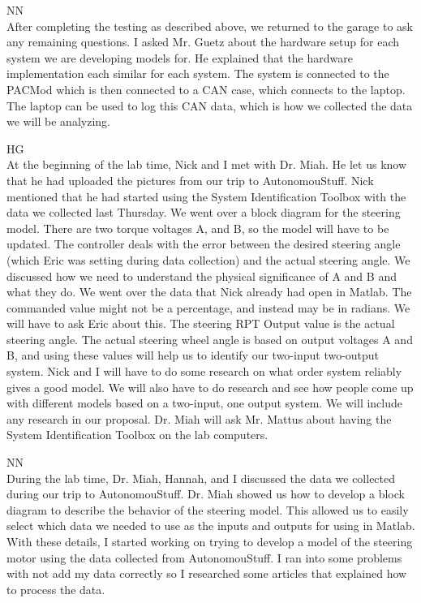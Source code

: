 \documentclass[fontsize=11pt, %
                             paper=letter, %
                             openany, %
                             captions=tableheading,
                             index=totoc,
                             hyperref]{labbook}
\def\currentYear{2021}
\begin{document}
\begin{addmargin}[0cm]{0cm}
NN\\
After completing the testing as described above, we returned to the garage to ask any remaining questions. I asked Mr. Guetz about the hardware setup for each system we are developing models for. He explained that the hardware implementation each similar for each system. The system is connected to the PACMod which is then connected to a CAN case, which connects to the laptop. The laptop can be used to log this CAN data, which is how we collected the data we will be analyzing. 

\labday{Thursday, October 14, \currentYear}
HG\\
At the beginning of the lab time, Nick and I met with Dr. Miah. He let us know that he had uploaded the pictures from our trip to AutonomouStuff. Nick mentioned that he had started using the System Identification Toolbox with the data we collected last Thursday. We went over a block diagram for the steering model. There are two torque voltages A, and B, so the model will have to be updated. The controller deals with the error between the desired steering angle (which Eric was setting during data collection) and the actual steering angle. We discussed how we need to understand the physical significance of A and B and what they do. We went over the data that Nick already had open in Matlab. The commanded value might not be a percentage, and instead may be in radians. We will have to ask Eric about this. The steering RPT Output value is the actual steering angle. The actual steering wheel angle is based on output voltages A and B, and using these values will help us to identify our two-input two-output system. Nick and I will have to do some research on what order system reliably gives a good model. We will also have to do research and see how people come up with different models based on a two-input, one output system. We will include any research in our proposal. Dr. Miah will ask Mr. Mattus about having the System Identification Toolbox on the lab computers. 

NN\\
During the lab time, Dr. Miah, Hannah, and I discussed the data we collected during our trip to AutonomouStuff. Dr. Miah showed us how to develop a block diagram to describe the behavior of the steering model. This allowed us to easily select which data we needed to use as the inputs and outputs for using in Matlab. With these details, I started working on trying to develop a model of the steering motor using the data collected from AutonomouStuff. I ran into some problems with not add my data correctly so I researched some articles that explained how to process the data.


\end{addmargin}
\end{document}
